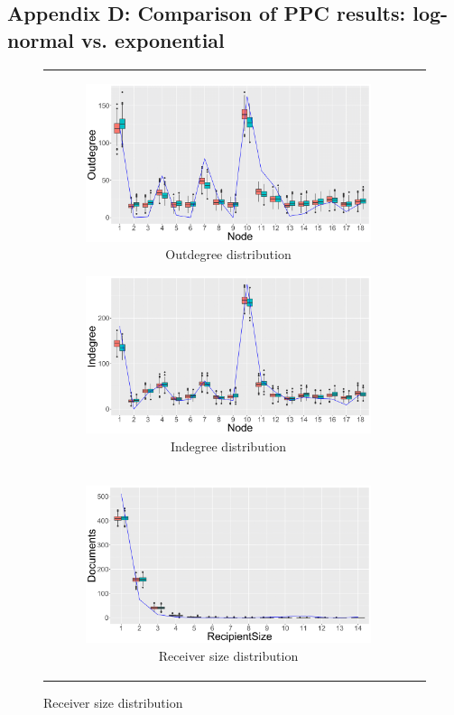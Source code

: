 \documentclass[ba]{imsart}
\numberwithin{equation}{section}
\theoremstyle{plain}
\begin{document}
		\subsection*{Appendix D: Comparison of PPC results: log-normal vs. exponential}\label{appendix: PPCexp}
		\begin{figure}[H]
			\centering
			\begin{tabular}[t]{cc}
				\begin{subfigure}[b]{0.495\textwidth}
					\caption{Outdegree distribution}
					\includegraphics[width=\textwidth]{img/outdegree2-1.png}	
				\end{subfigure}
				\begin{subfigure}[b]{0.495\textwidth}
					\caption{Indegree distribution}
					\includegraphics[width=\textwidth]{img/indegree2-1.png}	
				\end{subfigure}\\
				\begin{subfigure}[b]{0.495\textwidth}
					\caption{Receiver size distribution}
					\includegraphics[width=\textwidth]{img/recipientsize2-1.png}	

\end{subfigure}
\end{tabular}
\end{figure}
\end{document}
